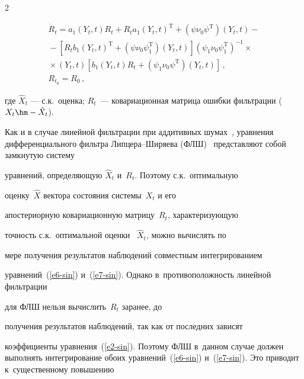 \begin{multicols}{2}
    \noindent

    \begin{multline}

       \dot{R}_t =  a_1\left(Y_t,t\right) R_t + R_t a_1 \left(Y_t,t\right)^{\mathrm{T}} +\left(\psi\nu_0\psi^{\mathrm{T}}\right) \left(Y_t,t\right) -{}\\

       {}-

\left[ R_t b_1 \left(Y_t,t\right)^{\mathrm{T}}

+\left(\psi\nu_0\psi_1^{\mathrm{T}}\right) \left(Y_t,t\right)\right] \left(\psi_1\nu_0\psi_1^{\mathrm{T}}\right)^{-1} \times{}\\

{}\times \left(Y_t,t\right)

 \left[ b_1 \left(Y_t,t\right) R_t+ \left(\psi_1 \nu_0 \psi^{\mathrm{T}}\right)

    \left(Y_t,t\right)\right]\,,\\

     R_{t_0} = R_0\,,\label{e7-sin}

    \end{multline}

где $\hat{X}_t$ --- с.к.\ оценка; $R_t$~--- ковариационная матрица ошибки фильтрации ($X_t\hm- \hat{X}_t$).





Как и в случае линейной фильтрации при аддитивных шумах~\cite{1-sin}, уравнения дифференциального фильтра Лип\-це\-ра--Ширяева (ФЛШ)~\cite{6-sin, 7-sin} пред\-ставляют собой замкнутую систему

уравнений, определяющую  $\hat{X}_t$ и~$R_t$. Поэтому с.к.\  оптимальную

оценку~$\hat{X}$ вектора состояния системы~$X_t$ и его

апостериорную ковариационную матрицу~$R_t$, характеризующую

точность с.к.\ оптимальной оценки ~$\hat{X}_t$, можно вычислять по

мере получения результатов наблюдений совместным интегрированием

уравнений~(\ref{e6-sin}) и~(\ref{e7-sin}). Однако в~противоположность линейной фильтрации

для ФЛШ нельзя вычислить~$R_t$ заранее, до

получения результатов наблюдений, так как от последних зависят

коэффициенты уравнения~(\ref{e2-sin}). Поэтому ФЛШ в~данном случае должен выполнять интегрирование обоих уравнений~(\ref{e6-sin}) и~(\ref{e7-sin}). Это приводит к~существенному повышению


\end{multicols}
